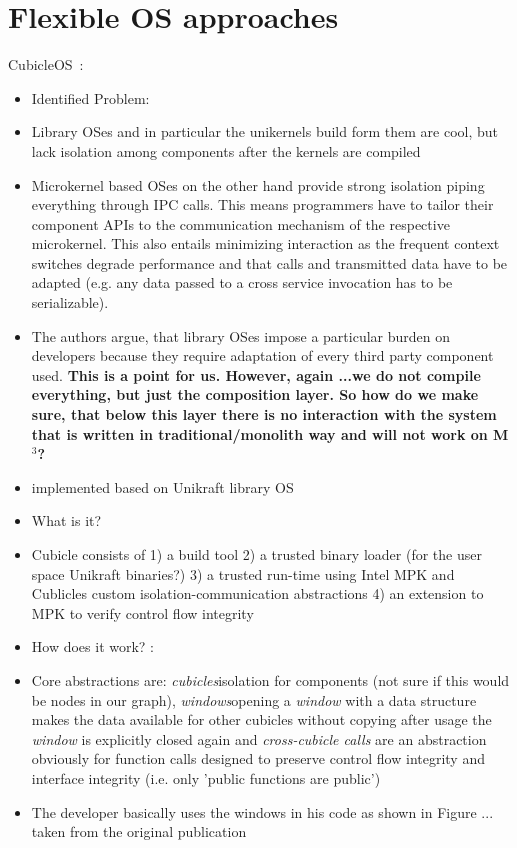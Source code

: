 \section{Flexible OS approaches}

CubicleOS~\cite{sartakov2021cubicleos}:
\begin{itemize}
    \item[]Identified Problem: 
    \item Library OSes and in particular the unikernels build form them are cool, but lack isolation among components after the kernels are compiled
    \item Microkernel based OSes on the other hand provide strong isolation piping everything through IPC calls. This means programmers have to tailor their component APIs to the communication mechanism of the respective microkernel. This also entails minimizing interaction as the frequent context switches degrade performance and that calls and transmitted data have to be adapted (e.g. any data passed to a cross service invocation has to be serializable). 
    \item The authors argue, that library OSes impose a particular burden on developers because they require adaptation of every third party component used. \means \textbf{This is a point for us. However, again ...we do not compile everything, but just the composition layer. So how do we make sure, that below this layer there is no interaction with the system that is written in traditional/monolith way and will not work on M$^3$?}
    \item implemented based on Unikraft library OS
    \item[] What is it?
    \item Cubicle consists of 1) a build tool 2) a trusted binary loader (for the user space Unikraft binaries?) 3) a trusted run-time using Intel MPK and Cublicles custom isolation-communication abstractions 4) an extension to MPK to verify control flow integrity
    \item[] How does it work? :
    \item Core abstractions are: \textit{cubicles}\means isolation for components (not sure if this would be nodes in our graph), \textit{windows}\means opening a \textit{window} with a data structure makes the data available for other cubicles without copying  after usage the \textit{window} is explicitly closed again   and \textit{ cross-cubicle calls} are an abstraction obviously for function calls designed to preserve control flow integrity and interface integrity (i.e. only 'public functions are public')
    \item The developer basically uses the windows in his code as shown in Figure ... taken from the original publication 
\end{itemize}

